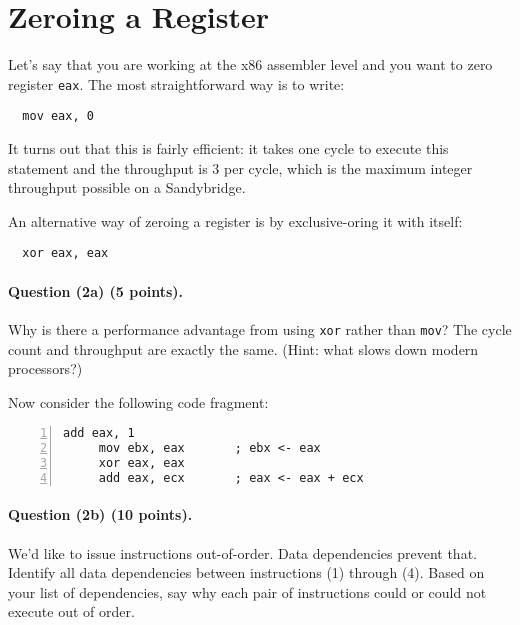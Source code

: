 \documentclass[12pt]{article}
\begin{document}
\section{Zeroing a Register}

Let's say that you are working at the x86 assembler level and you want
to zero register {\tt eax}. The most straightforward way is to write:

\begin{verbatim}
  mov eax, 0
\end{verbatim}

\noindent
It turns out that this is fairly efficient: it takes one cycle to execute
this statement and the throughput is 3 per cycle, which is the maximum
integer throughput possible on a Sandybridge.

\vspace*{1em} \noindent
An alternative way of zeroing a register is by exclusive-oring it with
itself:

\begin{lstlisting}
  xor eax, eax
\end{lstlisting}

\paragraph{Question (2a) (5 points).} Why is there a performance advantage 
from using {\tt xor} rather than {\tt mov}? The cycle count and
throughput are exactly the same. (Hint: what slows down modern processors?)

\vspace*{1em} \noindent
Now consider the following code fragment:

\begin{lstlisting}[numbers=left]
     add eax, 1
     mov ebx, eax       ; ebx <- eax
     xor eax, eax
     add eax, ecx       ; eax <- eax + ecx
\end{lstlisting}

\paragraph{Question (2b) (10 points).} 
We'd like to issue instructions out-of-order. Data dependencies
prevent that.  Identify all data dependencies between instructions (1)
through (4). Based on your list of dependencies, say why each pair of
instructions could or could not execute out of order.
\end{document}
